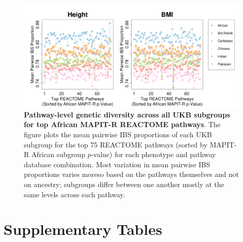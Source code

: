 \documentclass[12pt,a4paper]{article}
\begin{document}
\begin{figure}[htbp]
\centering
\includegraphics[scale=.35]{Images/Supp/InterPath_Supp_Figure_IBS_AllPopComps_vs3_REACTOME.png}
\caption[TBD]{\textbf{Pathway-level genetic diversity across all UKB subgroups for top African MAPIT-R REACTOME pathways}. The figure plots the mean pairwise IBS proportions of each UKB subgroup for the top 75 REACTOME pathways (sorted by MAPIT-R African subgroup $p$-value) for each phenotype and pathway database combination. Most variation in mean pairwise IBS proportions varies moreso based on the pathways themselves and not on ancestry; subgroups differ between one another mostly at the same levels across each pathway.}
\label{InterPath-Supp-Figure-IBS-AllPopComps-REACTOME}
\end{figure}
\clearpage

\section{Supplementary Tables}\label{Supplementary-Tables}
\end{document}
